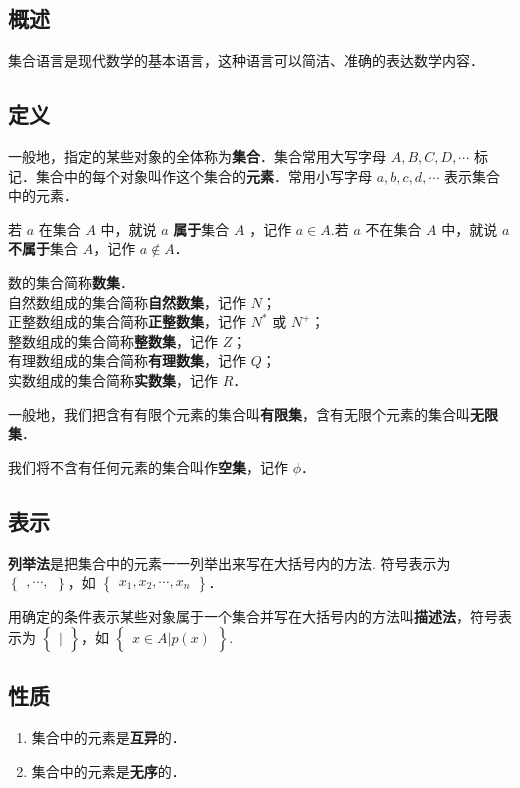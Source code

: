 
\begin{issues}
\issueDraft
\end{issues}

\subsection{概述}
集合语言是现代数学的基本语言，这种语言可以简洁、准确的表达数学内容．

\subsection{定义}
一般地，指定的某些对象的全体称为\textbf{集合}．集合常用大写字母 $A,B,C,D,\cdots$ 标记．集合中的每个对象叫作这个集合的\textbf{元素}．常用小写字母 $a,b,c,d,\cdots$ 表示集合中的元素．

若 $a$ 在集合 $A$ 中，就说 $a$ \textbf{属于}集合 $A$ ，记作 $a \in A$.若 $a$ 不在集合 $A$ 中，就说 $a$ \textbf{不属于}集合 $A$，记作 $a\notin A$．

数的集合简称\textbf{数集}．\\
自然数组成的集合简称\textbf{自然数集}，记作 $N$；\\
正整数组成的集合简称\textbf{正整数集}，记作 $N^{*}$ 或 $N^{+}$；\\
整数组成的集合简称\textbf{整数集}，记作 $Z$；\\
有理数组成的集合简称\textbf{有理数集}，记作 $Q$；\\
实数组成的集合简称\textbf{实数集}，记作 $R$．

一般地，我们把含有有限个元素的集合叫\textbf{有限集}，含有无限个元素的集合叫\textbf{无限集}．

我们将不含有任何元素的集合叫作\textbf{空集}，记作 $\phi$．

\subsection{表示}
\textbf{列举法}是把集合中的元素一一列举出来写在大括号内的方法.
符号表示为 $\begin{Bmatrix} ,\cdots, \end{Bmatrix}$，如 $\begin{Bmatrix} x_1,x_2, \cdots ,x_n \end{Bmatrix}$．

用确定的条件表示某些对象属于一个集合并写在大括号内的方法叫\textbf{描述法}，符号表示为 $\begin{Bmatrix} | \end{Bmatrix}$，如 $\begin{Bmatrix} x\in A|p(x) \end{Bmatrix}$.

\subsection{性质}
\begin{enumerate}
\item 集合中的元素是\textbf{互异}的．
\item 集合中的元素是\textbf{无序}的．
\end{enumerate}
